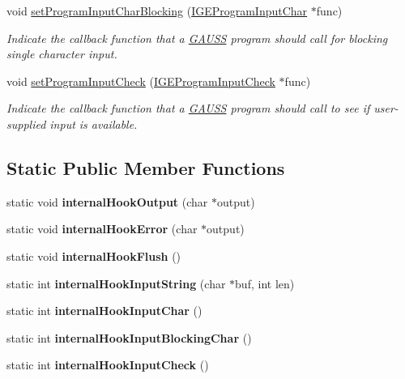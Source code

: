 \begin{DoxyCompactItemize}
void \hyperlink{class_g_a_u_s_s_a300d6e33dbfd2a45f56ff2769f585435}{set\-Program\-Input\-Char\-Blocking} (\hyperlink{class_i_g_e_program_input_char}{I\-G\-E\-Program\-Input\-Char} $\ast$func)
\begin{DoxyCompactList}\small\item\em Indicate the callback function that a \hyperlink{class_g_a_u_s_s}{G\-A\-U\-S\-S} program should call for blocking single character input. \end{DoxyCompactList}\item 
void \hyperlink{class_g_a_u_s_s_a6517b404cf71d157808a1cb73e3c0ddb}{set\-Program\-Input\-Check} (\hyperlink{class_i_g_e_program_input_check}{I\-G\-E\-Program\-Input\-Check} $\ast$func)
\begin{DoxyCompactList}\small\item\em Indicate the callback function that a \hyperlink{class_g_a_u_s_s}{G\-A\-U\-S\-S} program should call to see if user-\/supplied input is available. \end{DoxyCompactList}\end{DoxyCompactItemize}
\subsection*{Static Public Member Functions}
\begin{DoxyCompactItemize}
\item 
\hypertarget{class_g_a_u_s_s_ad907a936da9a60d342898b44bb37188c}{static void {\bfseries internal\-Hook\-Output} (char $\ast$output)}\label{class_g_a_u_s_s_ad907a936da9a60d342898b44bb37188c}

\item 
\hypertarget{class_g_a_u_s_s_addc2a30c69243f368be14bee3ada1761}{static void {\bfseries internal\-Hook\-Error} (char $\ast$output)}\label{class_g_a_u_s_s_addc2a30c69243f368be14bee3ada1761}

\item 
\hypertarget{class_g_a_u_s_s_a269ecd96318af60d348b650849d17c32}{static void {\bfseries internal\-Hook\-Flush} ()}\label{class_g_a_u_s_s_a269ecd96318af60d348b650849d17c32}

\item 
\hypertarget{class_g_a_u_s_s_ae9731be0762c7048f302be63c35827ce}{static int {\bfseries internal\-Hook\-Input\-String} (char $\ast$buf, int len)}\label{class_g_a_u_s_s_ae9731be0762c7048f302be63c35827ce}

\item 
\hypertarget{class_g_a_u_s_s_a67e47c77b2937d46ca7369d7244a86fd}{static int {\bfseries internal\-Hook\-Input\-Char} ()}\label{class_g_a_u_s_s_a67e47c77b2937d46ca7369d7244a86fd}

\item 
\hypertarget{class_g_a_u_s_s_abda34d5de755c678c5789d736480df17}{static int {\bfseries internal\-Hook\-Input\-Blocking\-Char} ()}\label{class_g_a_u_s_s_abda34d5de755c678c5789d736480df17}

\item 
\hypertarget{class_g_a_u_s_s_a24a9bde314967c81afed7a3cb150b94a}{static int {\bfseries internal\-Hook\-Input\-Check} ()}\label{class_g_a_u_s_s_a24a9bde314967c81afed7a3cb150b94a}

\end{DoxyCompactItemize}
